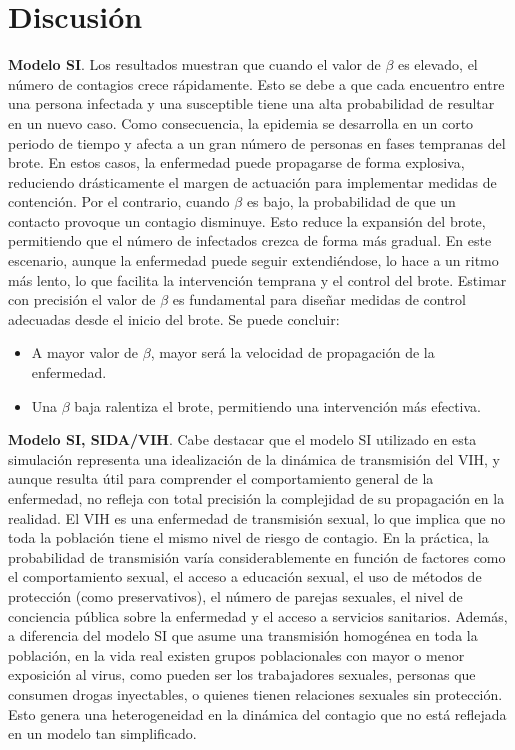 \section{Discusión}
\textbf{Modelo SI}. Los resultados muestran que cuando el valor de $\beta$ es elevado, el número de contagios crece rápidamente. Esto se debe a que cada encuentro entre una persona infectada y una susceptible tiene una alta probabilidad de resultar en un nuevo caso. Como consecuencia, la epidemia se desarrolla en un corto periodo de tiempo y afecta a un gran número de personas en fases tempranas del brote. En estos casos, la enfermedad puede propagarse de forma explosiva, reduciendo drásticamente el margen de actuación para implementar medidas de contención.
Por el contrario, cuando $\beta$ es bajo, la probabilidad de que un contacto provoque un contagio disminuye. Esto reduce la expansión del brote, permitiendo que el número de infectados crezca de forma más gradual. En este escenario, aunque la enfermedad puede seguir extendiéndose, lo hace a un ritmo más lento, lo que facilita la intervención temprana y el control del brote.
Estimar con precisión el valor de $\beta$ es fundamental para diseñar medidas de control adecuadas desde el inicio del brote.
Se puede concluir:
\begin{itemize}
    \item A mayor valor de $\beta$, mayor será la velocidad de propagación de la enfermedad.
    \item Una $\beta$ baja ralentiza el brote, permitiendo una intervención más efectiva.
\end{itemize}

\vspace{2em} 

\textbf{Modelo SI, SIDA/VIH}. Cabe destacar que el modelo SI utilizado en esta simulación representa una idealización de la dinámica de transmisión del VIH, y aunque resulta útil para comprender el comportamiento general de la enfermedad, no refleja con total precisión la complejidad de su propagación en la realidad.
El VIH es una enfermedad de transmisión sexual, lo que implica que no toda la población tiene el mismo nivel de riesgo de contagio. En la práctica, la probabilidad de transmisión varía considerablemente en función de factores como el comportamiento sexual, el acceso a educación sexual, el uso de métodos de protección (como preservativos), el número de parejas sexuales, el nivel de conciencia pública sobre la enfermedad y el acceso a servicios sanitarios.
Además, a diferencia del modelo SI que asume una transmisión homogénea en toda la población, en la vida real existen grupos poblacionales con mayor o menor exposición al virus, como pueden ser los trabajadores sexuales, personas que consumen drogas inyectables, o quienes tienen relaciones sexuales sin protección. Esto genera una heterogeneidad en la dinámica del contagio que no está reflejada en un modelo tan simplificado.

